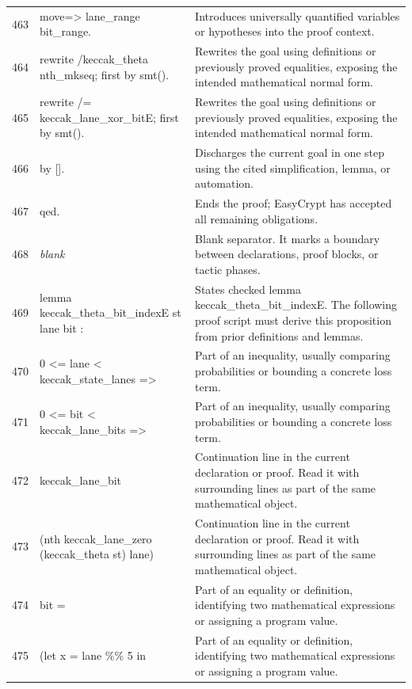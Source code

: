 \documentclass[10pt]{article}
\begin{document}
\begin{longtable}{r L{0.53\textwidth} L{0.37\textwidth}}
463 & {\ttfamily\scriptsize move=> lane\_range bit\_range.} & Introduces universally quantified variables or hypotheses into the proof context. \\
464 & {\ttfamily\scriptsize rewrite /keccak\_theta nth\_mkseq; first by smt().} & Rewrites the goal using definitions or previously proved equalities, exposing the intended mathematical normal form. \\
465 & {\ttfamily\scriptsize rewrite /= keccak\_lane\_xor\_bitE; first by smt().} & Rewrites the goal using definitions or previously proved equalities, exposing the intended mathematical normal form. \\
466 & {\ttfamily\scriptsize by [].} & Discharges the current goal in one step using the cited simplification, lemma, or automation. \\
467 & {\ttfamily\scriptsize qed.} & Ends the proof; EasyCrypt has accepted all remaining obligations. \\
468 & {\ttfamily\scriptsize \emph{blank}} & Blank separator.  It marks a boundary between declarations, proof blocks, or tactic phases. \\
469 & {\ttfamily\scriptsize lemma keccak\_theta\_bit\_indexE st lane bit :} & States checked lemma keccak\_theta\_bit\_indexE.  The following proof script must derive this proposition from prior definitions and lemmas. \\
470 & {\ttfamily\scriptsize   0 <= lane < keccak\_state\_lanes =>} & Part of an inequality, usually comparing probabilities or bounding a concrete loss term. \\
471 & {\ttfamily\scriptsize   0 <= bit < keccak\_lane\_bits =>} & Part of an inequality, usually comparing probabilities or bounding a concrete loss term. \\
472 & {\ttfamily\scriptsize   keccak\_lane\_bit} & Continuation line in the current declaration or proof.  Read it with surrounding lines as part of the same mathematical object. \\
473 & {\ttfamily\scriptsize     (nth keccak\_lane\_zero (keccak\_theta st) lane)} & Continuation line in the current declaration or proof.  Read it with surrounding lines as part of the same mathematical object. \\
474 & {\ttfamily\scriptsize     bit =} & Part of an equality or definition, identifying two mathematical expressions or assigning a program value. \\
475 & {\ttfamily\scriptsize   (let x = lane \%\% 5 in} & Part of an equality or definition, identifying two mathematical expressions or assigning a program value. \\

\end{longtable}
\end{document}
